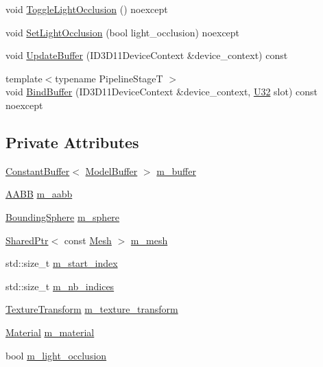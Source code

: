 \begin{DoxyCompactItemize}
void \mbox{\hyperlink{classmage_1_1rendering_1_1_model_ade8576cf32210153e65cd39b21940a67}{Toggle\+Light\+Occlusion}} () noexcept
\item 
void \mbox{\hyperlink{classmage_1_1rendering_1_1_model_a4064c86786e7dca7907435da1dce83a4}{Set\+Light\+Occlusion}} (bool light\+\_\+occlusion) noexcept
\item 
void \mbox{\hyperlink{classmage_1_1rendering_1_1_model_a31b3d4f544c8cfea4ad2054d594b2c53}{Update\+Buffer}} (I\+D3\+D11\+Device\+Context \&device\+\_\+context) const
\item 
{\footnotesize template$<$typename Pipeline\+StageT $>$ }\\void \mbox{\hyperlink{classmage_1_1rendering_1_1_model_a1247b104dff5f0eb1039b6e3ac0213ae}{Bind\+Buffer}} (I\+D3\+D11\+Device\+Context \&device\+\_\+context, \mbox{\hyperlink{namespacemage_aa5d6eaabaac3cdd01873d6a3d27e90f3}{U32}} slot) const noexcept
\end{DoxyCompactItemize}
\subsection*{Private Attributes}
\begin{DoxyCompactItemize}
\item 
\mbox{\hyperlink{classmage_1_1rendering_1_1_constant_buffer}{Constant\+Buffer}}$<$ \mbox{\hyperlink{structmage_1_1rendering_1_1_model_buffer}{Model\+Buffer}} $>$ \mbox{\hyperlink{classmage_1_1rendering_1_1_model_a82132035b4631143bed489c4bc190f95}{m\+\_\+buffer}}
\item 
\mbox{\hyperlink{classmage_1_1_a_a_b_b}{A\+A\+BB}} \mbox{\hyperlink{classmage_1_1rendering_1_1_model_a7b3bb86ad718ba3dae2b1c6042fdeaec}{m\+\_\+aabb}}
\item 
\mbox{\hyperlink{classmage_1_1_bounding_sphere}{Bounding\+Sphere}} \mbox{\hyperlink{classmage_1_1rendering_1_1_model_a88220cb828f0df79489c512245560616}{m\+\_\+sphere}}
\item 
\mbox{\hyperlink{namespacemage_a1e01ae66713838a7a67d30e44c67703e}{Shared\+Ptr}}$<$ const \mbox{\hyperlink{classmage_1_1rendering_1_1_mesh}{Mesh}} $>$ \mbox{\hyperlink{classmage_1_1rendering_1_1_model_a38be646490affe6bd2f2f2bb61d04caa}{m\+\_\+mesh}}
\item 
std\+::size\+\_\+t \mbox{\hyperlink{classmage_1_1rendering_1_1_model_ae92a44ede07f136ac89b25c34a8716cc}{m\+\_\+start\+\_\+index}}
\item 
std\+::size\+\_\+t \mbox{\hyperlink{classmage_1_1rendering_1_1_model_afc57d62ba9abcc13bce10f96ec9b2a03}{m\+\_\+nb\+\_\+indices}}
\item 
\mbox{\hyperlink{classmage_1_1_texture_transform}{Texture\+Transform}} \mbox{\hyperlink{classmage_1_1rendering_1_1_model_a00ad04fc770af700b97f69c83dc01d70}{m\+\_\+texture\+\_\+transform}}
\item 
\mbox{\hyperlink{classmage_1_1rendering_1_1_material}{Material}} \mbox{\hyperlink{classmage_1_1rendering_1_1_model_a933d2f661f511908e7c1e9030cfc777d}{m\+\_\+material}}
\item 
bool \mbox{\hyperlink{classmage_1_1rendering_1_1_model_a796fd0c51ea194826dde990b10e70856}{m\+\_\+light\+\_\+occlusion}}
\end{DoxyCompactItemize}
